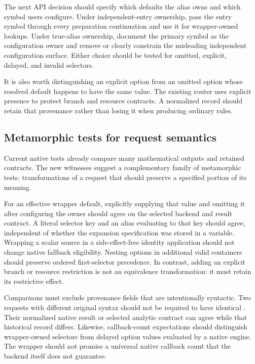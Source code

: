 \documentclass[11pt,letterpaper]{article}
\newcommand{\code}[1]{\texttt{\detokenize{#1}}}
\begin{document}
The next API decision should specify which defaults the alias owns and which
symbol users configure. Under independent-entry ownership, pass the entry
symbol through every preparation continuation and use it for wrapper-owned
\code{OptionValue} lookups. Under true-alias ownership, document the primary
symbol as the configuration owner and remove or clearly constrain the
misleading independent configuration surface. Either choice should be tested
for omitted, explicit, delayed, and invalid selectors.

It is also worth distinguishing an explicit option from an omitted option
whose resolved default happens to have the same value. The existing router
uses explicit presence to protect branch and resource contracts. A normalized
record should retain that provenance rather than losing it when producing
ordinary rules.

\subsection{Metamorphic tests for request semantics}

Current native tests already compare many mathematical outputs and retained
contracts. The new witnesses suggest a complementary family of metamorphic
tests: transformations of a request that should preserve a specified portion
of its meaning.

For an effective wrapper default, explicitly supplying that value and omitting
it after configuring the owner should agree on the selected backend and
result contract. A literal selector key and an alias evaluating to that key
should agree, independent of whether the expansion specification was stored
in a variable. Wrapping a scalar source in a side-effect-free identity
application should not change native fallback eligibility. Nesting options
in additional valid containers should preserve ordered first-selector
precedence. In contrast, adding an explicit branch or resource restriction
is not an equivalence transformation: it must retain its restrictive effect.

Comparisons must exclude provenance fields that are intentionally syntactic.
Two requests with different original syntax should not be required to have
identical \code{"OriginalArguments"}. Their normalized native result or
selected analytic contract can agree while that historical record differs.
Likewise, callback-count expectations should distinguish wrapper-owned
selectors from delayed option values evaluated by a native engine. The
wrapper should not promise a universal native callback count that the backend
itself does not guarantee.
\end{document}
